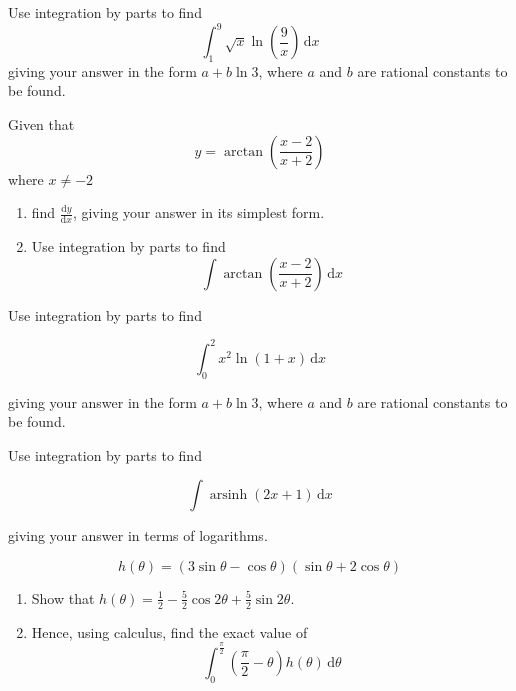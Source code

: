 \documentclass[leqno]{article}
\begin{document}
\djsFrontMatter
\begin{enumerate}[
  label=\textbf{\arabic*.},
  leftmargin=*,
  topsep=0pt,
  partopsep=0pt,
  parsep=0pt
]

\questionitem

Use integration by parts to find
\[
\int_1^9 \sqrt{x}\ln\left(\frac{9}{x}\right)\,\mathrm{d}x
\]
giving your answer in the form $a + b\ln 3$, where $a$ and $b$ are rational constants to be found. 
\newpage
\questionitem

Given that
\[
y = \arctan\left(\frac{x-2}{x+2}\right)
\]
where $x\ne -2$ \\
\begin{enumerate}[label=\textbf{(\alph*)}]
  \item find $\frac{\mathrm{d}y}{\mathrm{d}x}$, giving your answer in its simplest form.  \\
  \item Use integration by parts to find
  \[
  \int \arctan\left(\frac{x-2}{x+2}\right)\,\mathrm{d}x
  \]
\end{enumerate}
  

\newpage
\questionitem
Use integration by parts to find


  \[
  \int_0^2 x^2 \ln(1+x)\,\mathrm{d}x
  \]
  
  giving your answer in the form $a + b\ln 3$, where $a$ and $b$ are rational constants to be found.  \\

\newpage

\questionitem

Use integration by parts to find 

\[
\int \operatorname{arsinh}(2x+1)\, \mathrm{d}x
\]

giving your answer in terms of logarithms. 

\newpage

\questionitem

\[
h(\theta)=(3\sin\theta-\cos\theta)(\sin\theta+2\cos\theta)
\]
\begin{enumerate}[label=\textbf{(\alph*)}]
  \item Show that $h(\theta)=\frac{1}{2}-\frac{5}{2}\cos 2\theta+\frac{5}{2}\sin 2\theta$.  \\
  \item Hence, using calculus, find the exact value of
  \[
  \int_{0}^{\frac{\pi}{2}} \left(\frac{\pi}{2}-\theta\right) h(\theta)\,\mathrm{d}\theta
  \]
\end{enumerate}


\end{enumerate}
\end{document}
